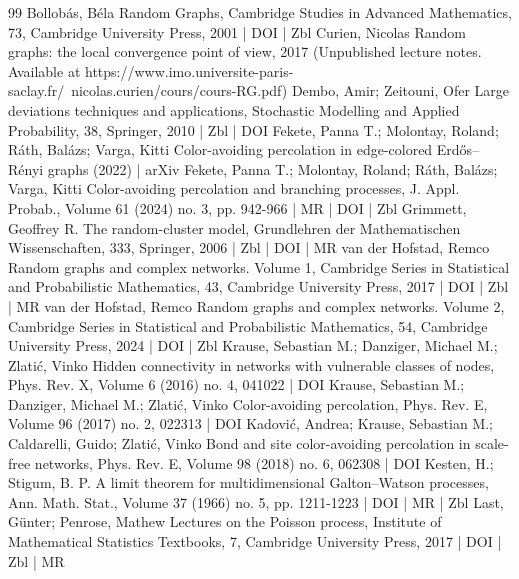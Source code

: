 \documentclass[10pt]{amsart}
\theoremstyle{definition}\newtheorem{defi}[theo]{Definition}\newtheorem{rema}[theo]{Remark}\newtheorem{exam}[theo]{Example}\newtheorem{exem}[theo]{Example}\newtheorem{nota}[theo]{Notation}
\begin{document}
\begin{thebibliography}{99}
 Bollobás, Béla Random Graphs, Cambridge Studies in Advanced Mathematics, 73, Cambridge University Press, 2001 | DOI | Zbl
 Curien, Nicolas Random graphs: the local convergence point of view, 2017 (Unpublished lecture notes. Available at https://www.imo.universite-paris-saclay.fr/~nicolas.curien/cours/cours-RG.pdf)
 Dembo, Amir; Zeitouni, Ofer Large deviations techniques and applications, Stochastic Modelling and Applied Probability, 38, Springer, 2010 | Zbl | DOI
 Fekete, Panna T.; Molontay, Roland; Ráth, Balázs; Varga, Kitti Color-avoiding percolation in edge-colored Erdős–Rényi graphs (2022) | arXiv
 Fekete, Panna T.; Molontay, Roland; Ráth, Balázs; Varga, Kitti Color-avoiding percolation and branching processes, J. Appl. Probab., Volume 61 (2024) no. 3, pp. 942-966 | MR | DOI | Zbl
 Grimmett, Geoffrey R. The random-cluster model, Grundlehren der Mathematischen Wissenschaften, 333, Springer, 2006 | Zbl | DOI | MR
 van der Hofstad, Remco Random graphs and complex networks. Volume 1, Cambridge Series in Statistical and Probabilistic Mathematics, 43, Cambridge University Press, 2017 | DOI | Zbl | MR
 van der Hofstad, Remco Random graphs and complex networks. Volume 2, Cambridge Series in Statistical and Probabilistic Mathematics, 54, Cambridge University Press, 2024 | DOI | Zbl
 Krause, Sebastian M.; Danziger, Michael M.; Zlatić, Vinko Hidden connectivity in networks with vulnerable classes of nodes, Phys. Rev. X, Volume 6 (2016) no. 4, 041022 | DOI
 Krause, Sebastian M.; Danziger, Michael M.; Zlatić, Vinko Color-avoiding percolation, Phys. Rev. E, Volume 96 (2017) no. 2, 022313 | DOI
 Kadović, Andrea; Krause, Sebastian M.; Caldarelli, Guido; Zlatić, Vinko Bond and site color-avoiding percolation in scale-free networks, Phys. Rev. E, Volume 98 (2018) no. 6, 062308 | DOI
 Kesten, H.; Stigum, B. P. A limit theorem for multidimensional Galton–Watson processes, Ann. Math. Stat., Volume 37 (1966) no. 5, pp. 1211-1223 | DOI | MR | Zbl
 Last, Günter; Penrose, Mathew Lectures on the Poisson process, Institute of Mathematical Statistics Textbooks, 7, Cambridge University Press, 2017 | DOI | Zbl | MR
\end{thebibliography}
\end{document}
